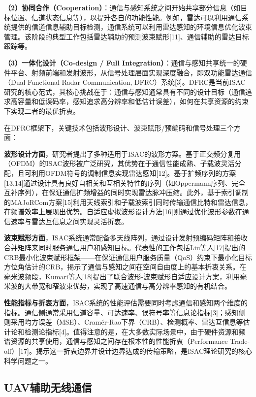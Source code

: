 \textbf{（2）协同合作（Cooperation）}：通信与感知系统之间开始共享部分信息（如目标位置、信道状态信息等），以提升各自的功能性能。例如，雷达可以利用通信系统提供的信道信息辅助目标检测，通信系统可以利用雷达感知的环境信息优化波束管理。该阶段的典型工作包括雷达辅助的预测波束赋形[11]、通信辅助的雷达目标跟踪等。

\textbf{（3）一体化设计（Co-design / Full Integration）}：通信与感知共享统一的硬件平台、射频前端和发射波形，从信号处理层面实现深度融合，即双功能雷达通信（Dual-Functional Radar-Communication, DFRC）系统[3]。DFRC是当前ISAC研究的核心范式，其核心挑战在于：通信与感知通常具有不同的设计目标（通信追求高容量和低误码率，感知追求高分辨率和低估计误差），如何在共享资源的约束下实现二者的最优折衷。

在DFRC框架下，关键技术包括波形设计、波束赋形/预编码和信号处理三个方面：

\textbf{波形设计方面}，研究者提出了多种适用于ISAC的波形方案。基于正交频分复用（OFDM）的ISAC波形被广泛研究，其优势在于通信性能成熟、子载波灵活分配，且可利用OFDM符号的调制信息实现雷达感知[12]。基于扩频序列的方案[13,14]通过设计具有良好自相关和互相关特性的序列（如Oppermann序列、完全互补序列），在保证通信扩频增益的同时实现雷达脉冲压缩。此外，基于索引调制的MAJoRCom方案[15]利用天线索引和子载波索引同时传输通信比特和雷达信息，在频谱效率上展现出优势。自适应虚拟波形设计方法[16]则通过优化波形参数在通信速率与雷达互信息之间实现灵活折衷。

\textbf{波束赋形方面}，ISAC系统通常配备多天线阵列，通过设计发射预编码矩阵和接收合并矩阵来同时服务通信用户和感知目标。代表性的工作包括Liu等人[17]提出的CRB最小化波束赋形框架——在保证通信用户服务质量（QoS）约束下最小化目标方位角估计的CRB，揭示了通信与感知之间在空间自由度上的基本折衷关系。在毫米波频段，Kumari等人[18]提出了联合波形-波束赋形自适应设计方案，利用毫米波的大带宽和窄波束优势，实现了高速通信与高分辨率感知的有机结合。

\textbf{性能指标与折衷方面}，ISAC系统的性能评估需要同时考虑通信和感知两个维度的指标。通信侧通常采用信道容量、可达速率、误符号率等信息论指标[3]；感知侧则采用均方误差（MSE）、Cram\'{e}r-Rao下界（CRB）、检测概率、雷达互信息等估计论和检测论指标[4]。值得注意的是，在大多数实际场景中，由于硬件资源和频谱资源的共享使用，通信与感知之间存在根本性的性能折衷（Performance Trade-off）[17]。揭示这一折衷边界并设计边界达成的传输策略，是ISAC理论研究的核心科学问题之一。

\subsection{UAV辅助无线通信}

